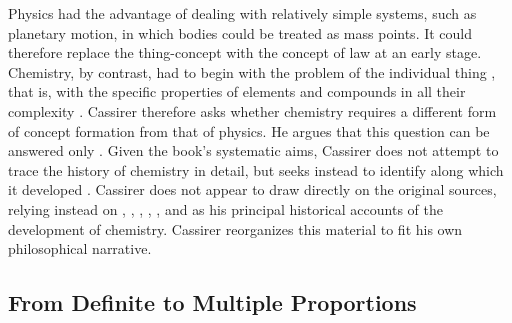 \documentclass[submitted,12pt]{article}
\begin{document}
Physics had the advantage of dealing with relatively simple systems, such as planetary motion, in which bodies could be treated as  mass points. It could therefore replace the thing-concept  with the concept of law  at an early stage. Chemistry, by contrast, had to begin with the problem of the individual thing , that is, with the specific properties of elements and compounds in all their complexity . Cassirer therefore asks whether chemistry requires a different form of concept formation from that of physics. He argues that this question can be answered only  . Given the book's systematic aims, Cassirer does not attempt to trace the history of chemistry in detail, but seeks instead to identify  along which it developed .  Cassirer does not appear to draw directly on the original sources, relying instead on \citet{Wurtz1879}, \citet{Meyer1884}, \citet{Berthelot1885}, \citet{Ladenburg1902}, \citet{Duhem1902}, and \citet{Ostwald1906Leitlinien} as his principal historical accounts of the development of chemistry. Cassirer reorganizes this material to fit his own philosophical narrative.

\subsection{From Definite to Multiple Proportions}
\end{document}
